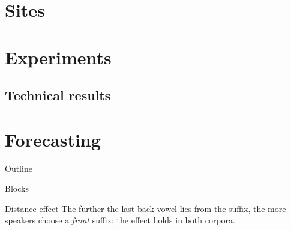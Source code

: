 \documentclass[aspectratio=169]{beamer}
\begin{document}
\section{Sites}
\section{Experiments}
\subsection{Technical results}
\section{Forecasting}
\begin{frame}{Outline}
\tableofcontents[currentsection]
\end{frame}

\begin{frame}{Blocks}
\begin{block}{Distance effect}
The further the last back vowel lies from the suffix, the more speakers choose a
\emph{front} suffix; the effect holds in both corpora.
\end{block}
\end{frame}
\end{document}
